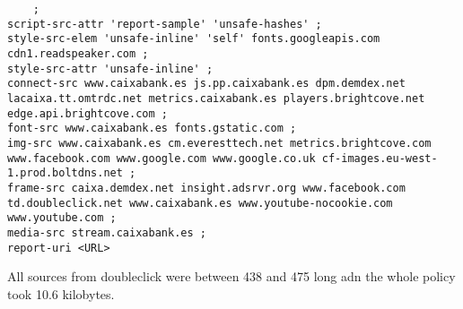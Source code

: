\begin{verbatim}
	;
script-src-attr 'report-sample' 'unsafe-hashes' ; 
style-src-elem 'unsafe-inline' 'self' fonts.googleapis.com cdn1.readspeaker.com ; 
style-src-attr 'unsafe-inline' ; 
connect-src www.caixabank.es js.pp.caixabank.es dpm.demdex.net lacaixa.tt.omtrdc.net metrics.caixabank.es players.brightcove.net edge.api.brightcove.com ; 
font-src www.caixabank.es fonts.gstatic.com ; 
img-src www.caixabank.es cm.everesttech.net metrics.brightcove.com www.facebook.com www.google.com www.google.co.uk cf-images.eu-west-1.prod.boltdns.net ; 
frame-src caixa.demdex.net insight.adsrvr.org www.facebook.com td.doubleclick.net www.caixabank.es www.youtube-nocookie.com www.youtube.com ; 
media-src stream.caixabank.es ; 
report-uri <URL>
\end{verbatim}
All sources from doubleclick were between 438 and 475 long adn the whole policy took 10.6 kilobytes.

